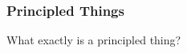 \begin{frame}
\frametitle{Principled Things}

\begin{center}What exactly is a principled thing?\end{center}

\end{frame}

